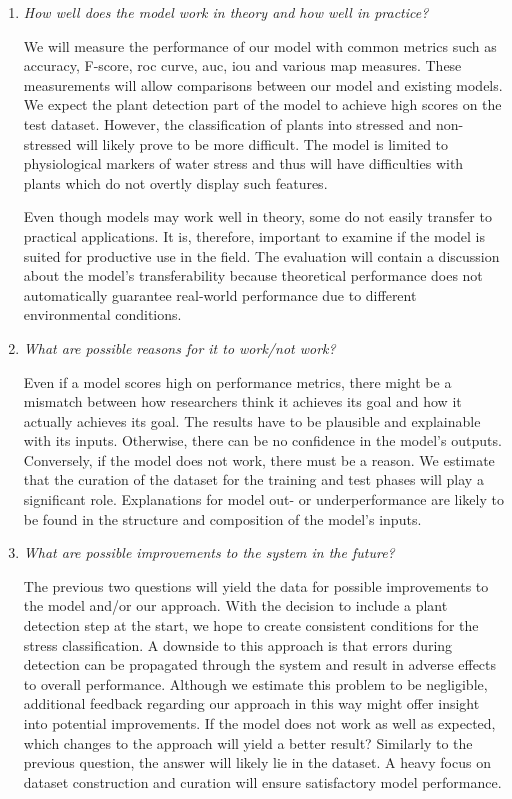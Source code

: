 \documentclass[draft,final]{vutinfth} %
\begin{document}
\begin{enumerate}
\item \emph{How well does the model work in theory and how well in
    practice?}

  We will measure the performance of our model with common metrics
  such as accuracy, F-score, \gls{roc} curve, \gls{auc}, \gls{iou} and
  various \gls{map} measures. These measurements will allow
  comparisons between our model and existing models. We expect the
  plant detection part of the model to achieve high scores on the test
  dataset. However, the classification of plants into stressed and
  non-stressed will likely prove to be more difficult. The model is
  limited to physiological markers of water stress and thus will have
  difficulties with plants which do not overtly display such features.

  Even though models may work well in theory, some do not easily
  transfer to practical applications. It is, therefore, important to
  examine if the model is suited for productive use in the field. The
  evaluation will contain a discussion about the model's
  transferability because theoretical performance does not
  automatically guarantee real-world performance due to different
  environmental conditions.
\item \emph{What are possible reasons for it to work/not work?}

  Even if a model scores high on performance metrics, there might be a
  mismatch between how researchers think it achieves its goal and how
  it actually achieves its goal. The results have to be plausible and
  explainable with its inputs. Otherwise, there can be no confidence
  in the model's outputs. Conversely, if the model does not work,
  there must be a reason. We estimate that the curation of the dataset
  for the training and test phases will play a significant
  role. Explanations for model out- or underperformance are likely to
  be found in the structure and composition of the model's inputs.
\item \emph{What are possible improvements to the system in the
    future?}

  The previous two questions will yield the data for possible
  improvements to the model and/or our approach. With the decision to
  include a plant detection step at the start, we hope to create
  consistent conditions for the stress classification. A downside to
  this approach is that errors during detection can be propagated
  through the system and result in adverse effects to overall
  performance. Although we estimate this problem to be negligible,
  additional feedback regarding our approach in this way might offer
  insight into potential improvements. If the model does not work as
  well as expected, which changes to the approach will yield a better
  result? Similarly to the previous question, the answer will likely
  lie in the dataset. A heavy focus on dataset construction and
  curation will ensure satisfactory model performance.
\end{enumerate}
\end{document}
